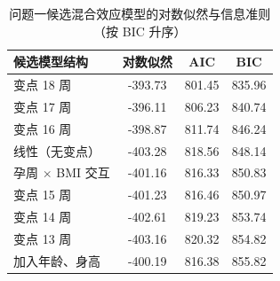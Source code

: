 \begin{table}[!htbp]
  \centering
  \caption{问题一候选混合效应模型的对数似然与信息准则（按 BIC 升序）}
  \label{tab:a1}
  \small
  \begin{tabular}{@{}lccc@{}}
    \toprule
    候选模型结构 & 对数似然 & AIC & BIC \\
    \midrule
    变点 18 周 & -393.73 & 801.45 & 835.96 \\
    变点 17 周 & -396.11 & 806.23 & 840.74 \\
    变点 16 周 & -398.87 & 811.74 & 846.24 \\
    线性（无变点） & -403.28 & 818.56 & 848.14 \\
    孕周 $\times$ BMI 交互 & -401.16 & 816.33 & 850.83 \\
    变点 15 周 & -401.23 & 816.46 & 850.97 \\
    变点 14 周 & -402.61 & 819.23 & 853.74 \\
    变点 13 周 & -403.16 & 820.32 & 854.82 \\
    加入年龄、身高 & -400.19 & 816.38 & 855.82 \\
    \bottomrule
  \end{tabular}
\end{table}
